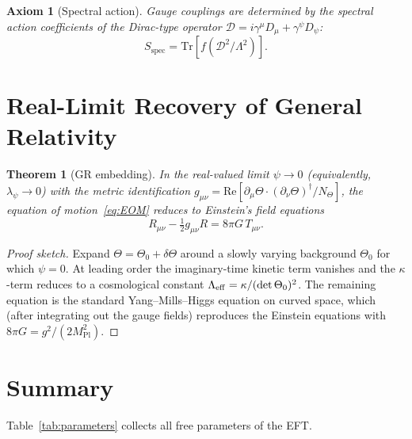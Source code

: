 \documentclass[12pt]{article}
\newtheorem{axiom}{Axiom}[section]
\newtheorem{theorem}{Theorem}[section]
\newcommand{\Tr}{\mathrm{Tr}}
\newcommand{\D}{\mathcal{D}}
\begin{document}
\begin{axiom}[Spectral action]
\label{ass:spectral}
Gauge couplings are determined by the spectral action coefficients of the
Dirac-type operator $\D = i\gamma^\mu D_\mu + \gamma^\psi D_\psi$:
\[
  S_{\mathrm{spec}} = \Tr\!\left[f\!\left(\D^2/\Lambda^2\right)\right].
\]
\end{axiom}

\section{Real-Limit Recovery of General Relativity}

\begin{theorem}[GR embedding]
\label{thm:GR_limit}
In the real-valued limit $\psi\to 0$ (equivalently, $\lambda_\psi\to 0$) with the
metric identification $g_{\mu\nu} = \mathrm{Re}[\partial_\mu\Theta\cdot(\partial_\nu\Theta)^\dagger/N_\Theta]$,
the equation of motion~\eqref{eq:EOM} reduces to Einstein's field equations
\[
  R_{\mu\nu} - \tfrac{1}{2}g_{\mu\nu}R = 8\pi G\,T_{\mu\nu}.
\]
\end{theorem}

\begin{proof}[Proof sketch]
Expand $\Theta = \Theta_0 + \delta\Theta$ around a slowly varying background
$\Theta_0$ for which $\psi = 0$.  At leading order the imaginary-time kinetic term
vanishes and the $\kappa$-term reduces to a cosmological constant
$\Lambda_{\rm eff} = \kappa/(\det\Theta_0)^2$.  The remaining equation is the
standard Yang--Mills--Higgs equation on curved space, which (after integrating out
the gauge fields) reproduces the Einstein equations with $8\pi G = g^2/(2M_\mathrm{Pl}^2)$.
\end{proof}

\section{Summary}

Table~\ref{tab:parameters} collects all free parameters of the EFT.
\end{document}
